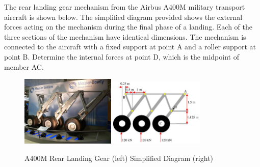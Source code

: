 
The rear landing gear mechanism from the Airbus A400M military transport aircraft is shown below. The
simplified diagram provided shows the external forces acting on the mechanism during the final phase of a
landing. Each of the three sections of the mechanism have identical dimensions. The mechanism is connected
to the aircraft with a fixed support at point A and a roller support at point B. Determine the internal forces
at point D, which is the midpoint of member AC.

\begin{figure}[ht!]
  \centering
  \includegraphics[width=0.4\textwidth,
	           height=0.3\textheight,
		   keepaspectratio]{figa.png}
  \includegraphics[width=0.4\textwidth,
	           height=0.3\textheight,
		   keepaspectratio]{figb.png}
  \caption*{A400M Rear Landing Gear (left) Simplified Diagram (right)}
\end{figure}


